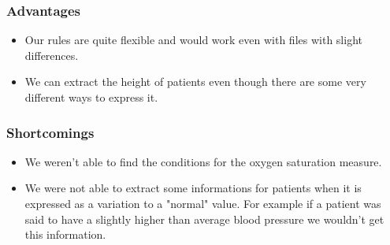 \documentclass{eplDoc}
\begin{document}
\subsubsection{Advantages}
\begin{itemize}
	\item Our rules are quite flexible and would work even with files with slight differences.
	\item We can extract the height of patients even though there are some very different ways to express it.
\end{itemize}
\subsubsection{Shortcomings}
\begin{itemize}
	\item We weren't able to find the conditions for the oxygen saturation measure. 
	\item We were not able to extract some informations for patients when it is expressed as a variation to a "normal" value. For example if a patient was said to have a slightly higher than average blood pressure we wouldn't get this information. 
\end{itemize}




\end{document}
